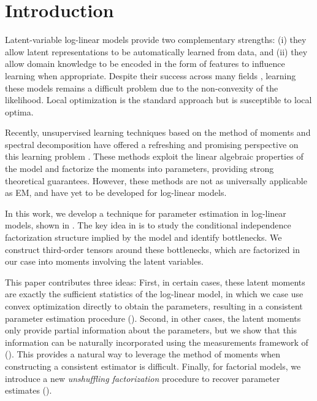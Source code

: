 \section{Introduction} \label{sec:introduction}

Latent-variable log-linear models provide two complementary strengths: (i) they allow
latent representations to be automatically learned from data, and (ii)
they allow domain knowledge to be encoded in the form of features to influence learning when appropriate.
Despite their success across many fields \cite{quattoni04crf,haghighi06prototype,liang06discrimative,kirkpatrick10painless,deselaers12latent},
learning these models remains a difficult problem due to the non-convexity of the likelihood.
Local optimization is the standard approach but is susceptible to local optima.

Recently, unsupervised learning techniques based on the method of moments and
spectral decomposition have offered a refreshing and promising perspective on
this learning problem \citep{hsu09spectral,anandkumar11tree,anandkumar12moments,anandkumar12lda,hsu12identifiability,balle11transducer,balle12automata}.
These methods exploit the linear algebraic properties of the model and
factorize the moments into parameters, providing strong theoretical guarantees.
However, these methods are not as universally applicable as EM, and have yet to
be developed for log-linear models.


In this work, we develop a technique for parameter estimation in log-linear
models, shown in .  The key idea in
\citet{anandkumar12moments,anandkumar13tensor} is to study the conditional
independence factorization structure implied by the model and identify
bottlenecks.  We construct third-order tensors around these bottlenecks, which
are factorized in our case into moments involving the latent variables.

This paper contributes three ideas:
First, in certain cases, these latent moments are exactly the sufficient statistics of
the log-linear model, in which we case use convex optimization directly to obtain the parameters,
resulting in a consistent parameter estimation procedure ().
Second, in other cases, the latent moments only provide partial information about the parameters,
but we show that this information can be naturally incorporated
using the measurements framework of \citet{liang09measurements} ().
This provides a natural way to leverage the method of moments when constructing
a consistent estimator is difficult.
Finally, for factorial models, we introduce a new \emph{unshuffling
factorization} procedure to recover parameter estimates ().

